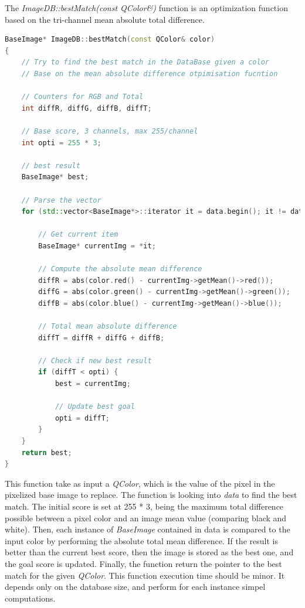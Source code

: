 \documentclass[aps,letterpaper,11pt]{revtex4}
\begin{document}
The \textit{ImageDB::bestMatch(const QColor\&)} function is an optimization function based on the tri-channel mean absolute total difference.


\begin{lstlisting}[language=C++]
BaseImage* ImageDB::bestMatch(const QColor& color)
{
    // Try to find the best match in the DataBase given a color
    // Base on the mean absolute difference otpimisation fucntion

    // Counters for RGB and Total
    int diffR, diffG, diffB, diffT;

    // Base score, 3 channels, max 255/channel
    int opti = 255 * 3;

    // best result
    BaseImage* best;

    // Parse the vector
    for (std::vector<BaseImage*>::iterator it = data.begin(); it != data.end(); it++) {

        // Get current item
        BaseImage* currentImg = *it;

        // Compute the absolute mean difference
        diffR = abs(color.red() - currentImg->getMean()->red());
        diffG = abs(color.green() - currentImg->getMean()->green());
        diffB = abs(color.blue() - currentImg->getMean()->blue());

        // Total mean absolute difference
        diffT = diffR + diffG + diffB;

        // Check if new best result
        if (diffT < opti) {
            best = currentImg;

            // Update best goal
            opti = diffT;
        }
    }
    return best;
}
\end{lstlisting}

This function take as input a \textit{QColor}, which is the value of the pixel in the pixelized base image to replace. The function is looking into \textit{data} to find the best match. The initial score is set at 255 * 3, being the maximum total difference possible between a pixel color and an image mean value (comparing black and white). Then, each instance of \textit{BaseImage} contained in data is compared to the input color by performing the absolute total mean difference. If the result is better than the current best score, then the image is stored as the best one, and the goal score is updated. Finally, the function return the pointer to the best match for the given \textit{QColor}.
This function execution time should be minor. It depends only on the database size, and perform for each instance simpel computations.
\end{document}
